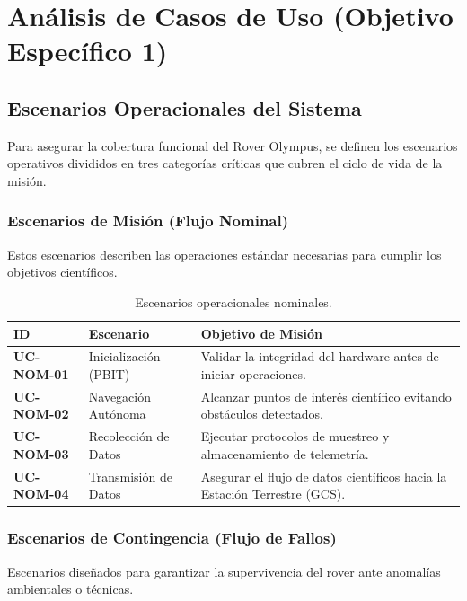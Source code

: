 
\section{Análisis de Casos de Uso (Objetivo Específico 1)}

\subsection{Escenarios Operacionales del Sistema}
Para asegurar la cobertura funcional del Rover Olympus, se definen los escenarios operativos divididos en tres categorías críticas que cubren el ciclo de vida de la misión.

\subsubsection{Escenarios de Misión (Flujo Nominal)}
Estos escenarios describen las operaciones estándar necesarias para cumplir los objetivos científicos.

\begin{table}[H]
	\centering
	\caption{Escenarios operacionales nominales.}
	\begin{tabularx}{\textwidth}{|l|l|X|}
		\hline
		\rowcolor{AgencyBlue!10} \textbf{ID} & \textbf{Escenario}    & \textbf{Objetivo de Misión}                                               \\ \hline
		\textbf{UC-NOM-01}                   & Inicialización (PBIT) & Validar la integridad del hardware antes de iniciar operaciones.          \\ \hline
		\textbf{UC-NOM-02}                   & Navegación Autónoma   & Alcanzar puntos de interés científico evitando obstáculos detectados.     \\ \hline
		\textbf{UC-NOM-03}                   & Recolección de Datos  & Ejecutar protocolos de muestreo y almacenamiento de telemetría.           \\ \hline
		\textbf{UC-NOM-04}                   & Transmisión de Datos  & Asegurar el flujo de datos científicos hacia la Estación Terrestre (GCS). \\ \hline
	\end{tabularx}
\end{table}

\subsubsection{Escenarios de Contingencia (Flujo de Fallos)}
Escenarios diseñados para garantizar la supervivencia del rover ante anomalías ambientales o técnicas.

